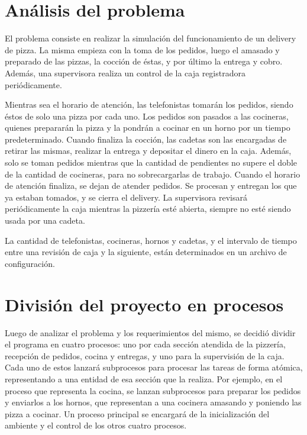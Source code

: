 \documentclass[11pt,spanish,a4paper,openany,notitlepage]{article}
\begin{document}
\newpage
\tableofcontents
\newpage

\section{Análisis del problema}

El problema consiste en realizar la simulación del funcionamiento de un delivery de pizza. La misma 
empieza con la toma de los pedidos, luego el amasado y preparado de las pizzas, la cocción de 
éstas, y por último la entrega y cobro. Además, una supervisora realiza un control de la caja 
registradora periódicamente.

Mientras sea el horario de atención, las telefonistas tomarán los pedidos, siendo éstos de solo una 
pizza por cada uno. Los pedidos son pasados a las cocineras, quienes prepararán la pizza y la 
pondrán a cocinar en un horno por un tiempo predeterminado. Cuando finaliza la cocción, las cadetas 
son las encargadas de retirar las mismas, realizar la entrega y depositar el dinero en la caja. 
Además, solo se toman pedidos mientras que la cantidad de pendientes no supere el doble de la 
cantidad de cocineras, para no sobrecargarlas de trabajo. 
Cuando el horario de atención finaliza, se dejan de atender pedidos. Se procesan y entregan los que 
ya estaban tomados, y se cierra el delivery.
La supervisora revisará periódicamente la caja mientras la pizzería esté abierta, siempre no esté 
siendo usada por una cadeta.

La cantidad de telefonistas, cocineras, hornos y cadetas, y el intervalo de tiempo entre una 
revisión de caja y la siguiente, están determinados en un archivo de configuración.

\newpage

\section{División del proyecto en procesos}

Luego de analizar el problema y los requerimientos del mismo, se decidió dividir el programa en 
cuatro procesos: uno por cada sección atendida de la pizzería, recepción de pedidos, cocina y 
entregas, y uno para la supervisión de la caja. Cada uno de estos lanzará subprocesos para 
procesar las tareas de forma atómica, representando a una entidad de esa sección que la realiza. 
Por ejemplo, en el proceso que representa la cocina, se lanzan subprocesos para preparar los 
pedidos y enviarlos a los hornos, que representan a una cocinera amasando y poniendo las pizza a 
cocinar.
Un proceso principal se encargará de la inicialización del ambiente y el control de los otros cuatro 
procesos.
\end{document}
